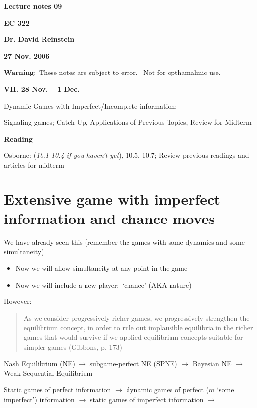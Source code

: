 \documentclass{article}
\begin{document}
\textbf{Lecture notes 09}

\textbf{EC 322}

\textbf{Dr. David Reinstein }

\textbf{27 Nov. 2006}\bigskip

\textbf{Warning}:\ These notes are subject to error. \ Not for opthamalmic
use.

\textbf{VII. 28 Nov. -- 1 Dec.}

Dynamic Games with Imperfect/Incomplete information;

Signaling games; Catch-Up, Applications of Previous Topics, Review for
Midterm

\textbf{Reading}

Osborne: (\textit{10.1-10.4 if you haven't yet}), 10.5, 10.7; Review
previous readings and articles for midterm

\bigskip

\section{Extensive game with imperfect information and chance moves}

We have already seen this (remember the games with some dynamics and some
simultaneity)

\begin{itemize}
\item Now we will allow simultaneity at any point in the game

\item Now we will include a new player:\ `chance' (AKA nature)
\end{itemize}

\bigskip

However:

\begin{quote}
As we consider progressively richer games, we progressively strengthen the
equilibrium concept, in order to rule out implausible equilibria in the
richer games that would survive if we applied equilibrium concepts suitable
for simpler games (Gibbons, p. 173)
\end{quote}

Nash Equilibrium (NE)$\ \mathbf{\rightarrow }$ subgame-perfect NE (SPNE) $%
\mathbf{\rightarrow }$ Bayesian NE $\mathbf{\rightarrow }$ Weak Sequential
Equilibrium

Static games of perfect information $\mathbf{\rightarrow }$ dynamic games of
perfect (or `some imperfect') information $\mathbf{\rightarrow }$ static
games of imperfect information $\mathbf{\rightarrow }$
\end{document}
